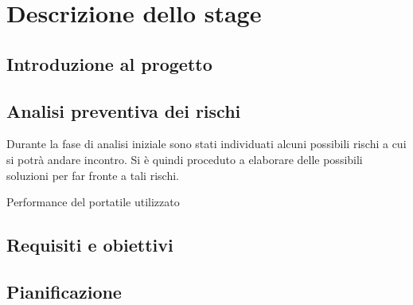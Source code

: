 
\chapter{Descrizione dello stage}\label{cap:descrizione-stage}


\section{Introduzione al progetto}

\section{Analisi preventiva dei rischi}

Durante la fase di analisi iniziale sono stati individuati alcuni possibili rischi a cui si potrà andare incontro.
Si è quindi proceduto a elaborare delle possibili soluzioni per far fronte a tali rischi.

\begin{risk}{Performance del portatile utilizzato}
    \label{risk:hardware-simulator}
\end{risk}

\section{Requisiti e obiettivi}


\section{Pianificazione}
